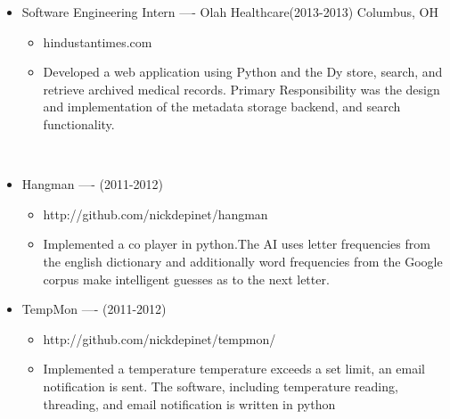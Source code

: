\documentclass[a4paper,10pt]{article}
\newcommand{\isep}{-2 pt}
\newcommand{\lsep}{-0.5cm}
\begin{document}
\begin{itemize}
\item 
 Software Engineering Intern  ---- Olah Healthcare(2013-2013)  Columbus, OH  \\[-0.6cm]

	\begin{itemize}\itemsep \isep 
	\item hindustantimes.com

	\item Developed a web application using Python and the Dy store, search, and retrieve archived medical records. Primary Responsibility was the design and implementation of the metadata storage backend, and search functionality. 

	\end{itemize}
\end{itemize}
 



\\[\lsep]

\begin{itemize}
\item 
 Hangman ---- (2011-2012)    \\[-0.6cm]

	\begin{itemize}\itemsep \isep 
	\item http://github.com/nickdepinet/hangman

	\item Implemented a co player in python.The AI uses letter frequencies from the english dictionary and additionally word frequencies from the Google corpus make intelligent guesses as to the next letter. 

	\end{itemize}
\end{itemize}

\begin{itemize}
\item 
 TempMon ---- (2011-2012)    \\[-0.6cm]

	\begin{itemize}\itemsep \isep 
	\item http://github.com/nickdepinet/tempmon/

	\item Implemented a temperature  temperature exceeds a set limit, an email notification is sent. The software, including temperature reading, threading, and email notification is written in python 

	\end{itemize}
\end{itemize}
\end{document}
